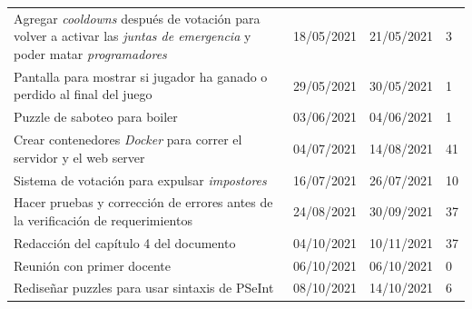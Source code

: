 \begin{longtable}[c]{m{} m{} m{} m{}}
        Agregar \textit{cooldowns} después de votación para volver a activar las \textit{juntas de emergencia} y poder matar \textit{programadores} & 18/05/2021 & 21/05/2021 & 3 \\  
        Pantalla para mostrar si jugador ha ganado o perdido al final del juego & 29/05/2021 & 30/05/2021 & 1 \\  
        Puzzle de saboteo para boiler & 03/06/2021 & 04/06/2021 & 1 \\  
        Crear contenedores \textit{Docker} para correr el servidor y el web server & 04/07/2021 & 14/08/2021 & 41 \\  
        Sistema de votación para expulsar \textit{impostores} & 16/07/2021 & 26/07/2021 & 10 \\  
        Hacer pruebas y corrección de errores antes de la verificación de requerimientos & 24/08/2021 & 30/09/2021 & 37 \\  
        Redacción del capítulo 4 del documento & 04/10/2021 & 10/11/2021 & 37 \\  
        Reunión con primer docente & 06/10/2021 & 06/10/2021 & 0 \\  
        Rediseñar puzzles para usar sintaxis de PSeInt & 08/10/2021 & 14/10/2021 & 6 \\  

\end{longtable}

